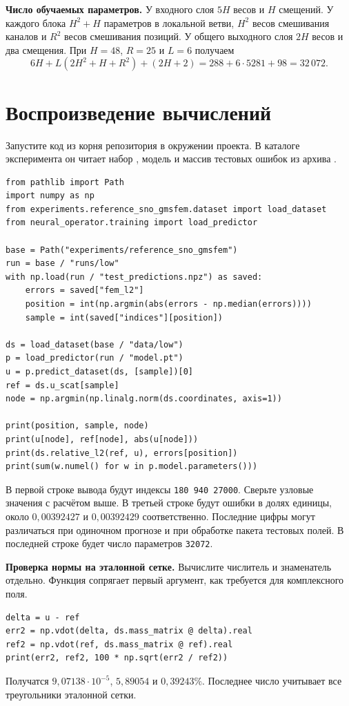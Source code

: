 \medskip
\textbf{Число обучаемых параметров.}
У входного слоя $5H$ весов и $H$ смещений. У каждого блока
$H^2+H$ параметров в локальной ветви, $H^2$ весов смешивания каналов
и $R^2$ весов смешивания позиций. У общего выходного слоя $2H$ весов
и два смещения. При $H=48$, $R=25$ и $L=6$ получаем
\[
 6H+L(2H^2+H+R^2)+(2H+2)=288+6\cdot5281+98=32\,072 .
\]

\clearpage
\section{Воспроизведение вычислений}

Запустите код из корня репозитория в окружении проекта. В каталоге
эксперимента он читает набор \mbox{}, модель
\mbox{} и массив тестовых ошибок 
из архива \mbox{}.

\begin{lstlisting}
from pathlib import Path
import numpy as np
from experiments.reference_sno_gmsfem.dataset import load_dataset
from neural_operator.training import load_predictor

base = Path("experiments/reference_sno_gmsfem")
run = base / "runs/low"
with np.load(run / "test_predictions.npz") as saved:
    errors = saved["fem_l2"]
    position = int(np.argmin(abs(errors - np.median(errors))))
    sample = int(saved["indices"][position])

ds = load_dataset(base / "data/low")
p = load_predictor(run / "model.pt")
u = p.predict_dataset(ds, [sample])[0]
ref = ds.u_scat[sample]
node = np.argmin(np.linalg.norm(ds.coordinates, axis=1))

print(position, sample, node)
print(u[node], ref[node], abs(u[node]))
print(ds.relative_l2(ref, u), errors[position])
print(sum(w.numel() for w in p.model.parameters()))
\end{lstlisting}

В первой строке вывода будут индексы \texttt{180 940 27000}. Сверьте
узловые значения с расчётом выше. В третьей строке будут ошибки в
долях единицы, около $0{,}00392427$ и $0{,}00392429$ соответственно.
Последние цифры могут различаться при одиночном прогнозе и
при обработке пакета тестовых полей. В последней строке будет
число параметров \texttt{32072}.

\textbf{Проверка нормы на эталонной сетке.}
Вычислите числитель и знаменатель отдельно. Функция 
сопрягает первый аргумент, как требуется для комплексного поля.
\begin{lstlisting}
delta = u - ref
err2 = np.vdot(delta, ds.mass_matrix @ delta).real
ref2 = np.vdot(ref, ds.mass_matrix @ ref).real
print(err2, ref2, 100 * np.sqrt(err2 / ref2))
\end{lstlisting}
Получатся $9{,}07138\cdot10^{-5}$, $5{,}89054$ и $0{,}39243\%$.
Последнее число учитывает все треугольники эталонной сетки.
